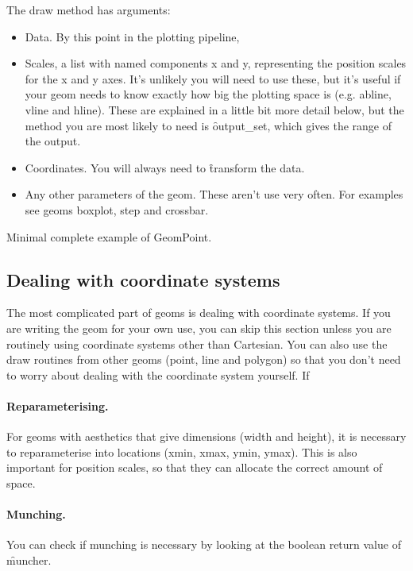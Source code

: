 
The draw method has arguments:

\begin{itemize}
  \item Data.  By this point in the plotting pipeline, 

  \item Scales, a list with named components x and y, representing the position scales for the x and y axes.  It's unlikely you will need to use these, but it's useful if your geom needs to know exactly how big the plotting space is (e.g. abline, vline and hline).  These are explained in a little bit more detail below, but the method you are most likely to need is \f{output_set}, which gives the range of the output.

  \item Coordinates.  You will always need to \f{transform} the data.

  \item Any other parameters of the geom.  These aren't use very often.  For examples see geoms boxplot, step and crossbar.
\end{itemize}

Minimal complete example of GeomPoint.


\subsection{Dealing with coordinate systems}

The most complicated part of geoms is dealing with coordinate systems. If you are writing the geom for your own use, you can skip this section unless you are routinely using coordinate systems other than Cartesian.  You can also use the draw routines from other geoms (point, line and polygon) so that you don't need to worry about dealing with the coordinate system yourself.  If 

\paragraph{Reparameterising.} For geoms with aesthetics that give dimensions (width and height), it is necessary to reparameterise into locations (xmin, xmax, ymin, ymax).  This is  also important for position scales, so that they can allocate the correct amount of space.

\paragraph{Munching.} You can check if munching is necessary by looking at the boolean return value of \f{muncher}. 

